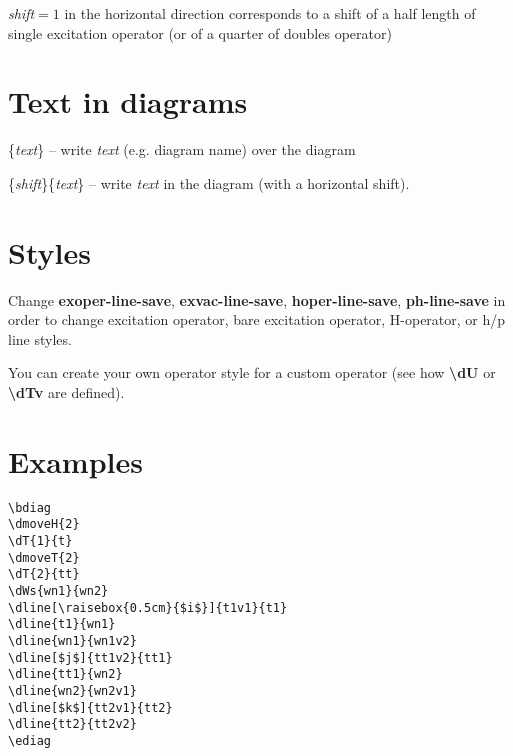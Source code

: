 \documentclass[a4paper]{article}
\newcommand{\myind}{\hspace{10pt}}
\begin{document}
{\it shift}$=1$ in the horizontal direction corresponds to a shift of a half length of single excitation operator
(or of a quarter of doubles operator) 

\section{Text in diagrams}

\myind{\bf \textbackslash dname}\{{\it text}\} -- write {\it text} (e.g. diagram name) over the diagram

\myind{\bf \textbackslash dtext}\{{\it shift}\}\{{\it text}\} -- write {\it text} in the diagram (with a horizontal shift).

\section{Styles}\label{sec:Styles}

Change {\bf exoper-line-save}, {\bf exvac-line-save}, {\bf hoper-line-save}, {\bf ph-line-save}
in order to change excitation operator, bare excitation operator, H-operator, or h/p line styles.

You can create your own operator style for a custom operator (see how {\bf \textbackslash dU} or {\bf \textbackslash dTv} are 
defined).

\section{Examples}

 \begin{minipage}[b]{0.5\linewidth}\centering
  \begin{lstlisting}
\bdiag
\dmoveH{2}
\dT{1}{t}
\dmoveT{2}
\dT{2}{tt}
\dWs{wn1}{wn2}
\dline[\raisebox{0.5cm}{$i$}]{t1v1}{t1}
\dline{t1}{wn1}
\dline{wn1}{wn1v2}
\dline[$j$]{tt1v2}{tt1}
\dline{tt1}{wn2}
\dline{wn2}{wn2v1}
\dline[$k$]{tt2v1}{tt2}
\dline{tt2}{tt2v2}
\ediag
  \end{lstlisting}
 \end{minipage}
 \begin{minipage}[b]{0.5\linewidth}\centering
\bdiag
{}
\ediag
 \end{minipage}
\end{document}
